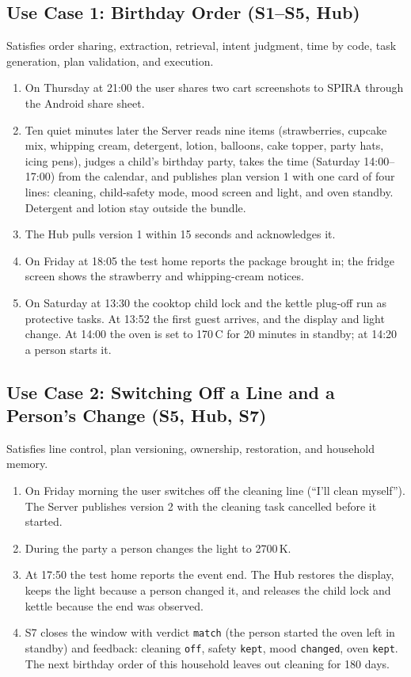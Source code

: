 \documentclass[conference]{IEEEtran}
\begin{document}
\subsection{Use Case 1: Birthday Order (S1--S5, Hub)}
Satisfies order sharing, extraction, retrieval, intent judgment, time by code, task generation, plan validation, and execution.
\begin{enumerate}
\item On Thursday at 21:00 the user shares two cart screenshots to SPIRA through the Android share sheet.
\item Ten quiet minutes later the Server reads nine items (strawberries, cupcake mix, whipping cream, detergent, lotion, balloons, cake topper, party hats, icing pens), judges a child's birthday party, takes the time (Saturday 14:00--17:00) from the calendar, and publishes plan version 1 with one card of four lines: cleaning, child-safety mode, mood screen and light, and oven standby. Detergent and lotion stay outside the bundle.
\item The Hub pulls version 1 within 15 seconds and acknowledges it.
\item On Friday at 18:05 the test home reports the package brought in; the fridge screen shows the strawberry and whipping-cream notices.
\item On Saturday at 13:30 the cooktop child lock and the kettle plug-off run as protective tasks. At 13:52 the first guest arrives, and the display and light change. At 14:00 the oven is set to 170\,\textdegree{}C for 20 minutes in standby; at 14:20 a person starts it.
\end{enumerate}

\subsection{Use Case 2: Switching Off a Line and a Person's Change (S5, Hub, S7)}
Satisfies line control, plan versioning, ownership, restoration, and household memory.
\begin{enumerate}
\item On Friday morning the user switches off the cleaning line (``I'll clean myself''). The Server publishes version 2 with the cleaning task cancelled before it started.
\item During the party a person changes the light to 2700\,K.
\item At 17:50 the test home reports the event end. The Hub restores the display, keeps the light because a person changed it, and releases the child lock and kettle because the end was observed.
\item S7 closes the window with verdict \texttt{match} (the person started the oven left in standby) and feedback: cleaning \texttt{off}, safety \texttt{kept}, mood \texttt{changed}, oven \texttt{kept}. The next birthday order of this household leaves out cleaning for 180 days.
\end{enumerate}
\end{document}
